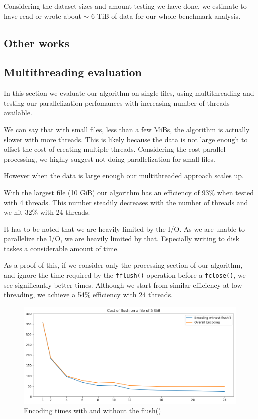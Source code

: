Considering the dataset sizes and amount testing we have done, we estimate to have read or wrote about $\sim$ 6 TiB of data for our whole benchmark analysis.
\subsection{Other works}

\subsection{Multithreading evaluation}
In this section we evaluate our algorithm on single files, using multithreading and testing our parallelization perfomances with increasing number of threads available.

We can say that with small files, less than a few MiBs, the algorithm is actually slower with more threads. 
This is likely because the data is not large enough to offset the cost of creating multiple threads. Considering the cost parallel processing, we highly suggest not doing parallelization for small files.

However when the data is large enough our multithreaded approach scales up.

With the largest file (10 GiB) our algorithm has an efficiency of 93\% when tested with 4 threads. This number steadily decreases with the number of threads and we hit 32\% with 24 threads.

It has to be noted that we are heavily limited by the I/O. As we are unable to parallelize the I/O, we are heavily limited by that. Especially writing to disk taskes a considerable amount of time.

As a proof of this, if we consider only the processing section of our algorithm, and ignore the time required by the \verb|fflush()| operation before a \verb|fclose()|, we see significantly better times. Although we start from similar efficiency at low threading, we achieve a 54\% efficiency with 24 threads.

\begin{figure}
	\centering
	\includegraphics[width=0.8\linewidth]{"../imgs/Flush vs non Flush"}
	\caption{Encoding times with and without the flush()}
	\label{fig:flush-vs-non-flush}
\end{figure}

